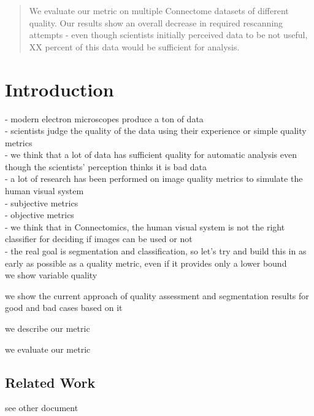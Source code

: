 \documentclass{llncs}
\begin{document}
\begin{abstract}
We evaluate our metric on multiple Connectome datasets of different quality. Our results show an overall decrease in required rescanning attempts - even though scientists initially perceived data to be not useful, XX percent of this data would be sufficient for analysis.


\end{abstract}

%
\section{Introduction}
- modern electron microscopes produce a ton of data\\
- scientists judge the quality of the data using their experience or simple quality metrics\\
- we think that a lot of data has sufficient quality for automatic analysis even though the scientists' perception thinks it is bad data\\
- a lot of research has been performed on image quality metrics to simulate the human visual system\\
- subjective metrics\\
- objective metrics\\
- we think that in Connectomics, the human visual system is not the right classifier for deciding if images can be used or not\\
- the real goal is segmentation and classification, so let's try and build this in as early as possible as a quality metric, even if it provides only a lower bound\\

we show variable quality

we show the current approach of quality assessment and segmentation results for good and bad cases based on it

we describe our metric

we evaluate our metric





%
%
\subsection{Related Work}
%
%
%
%
see other document
\end{document}
